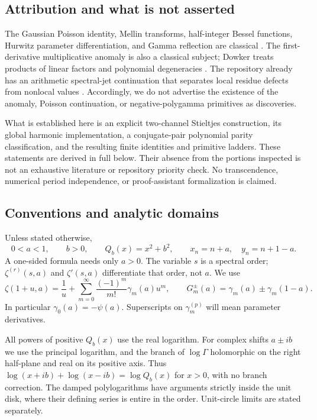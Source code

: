\documentclass[11pt,letterpaper]{article}
\numberwithin{equation}{section}
\theoremstyle{definition}
\begin{document}
\subsection{Attribution and what is not asserted}
The Gaussian Poisson identity, Mellin transforms, half-integer Bessel
functions, Hurwitz parameter differentiation, and Gamma reflection are
classical \cite{theta,bessel,halfK,hurwitz,gamma}. The first-derivative
multiplicative anomaly is also a classical subject; Dowker treats products
of linear factors and polynomial degeneracies \cite{dowker}. The repository
already has an arithmetic spectral-jet continuation that separates local
residue defects from nonlocal values \cite{arithmetic}. Accordingly, we do
not advertise the existence of the anomaly, Poisson continuation, or
negative-polygamma primitives as discoveries.

What is established here is an explicit two-channel Stieltjes construction,
its global harmonic implementation, a conjugate-pair polynomial parity
classification, and the resulting finite identities and primitive ladders.
These statements are derived in full below. Their absence from the portions
inspected is not an exhaustive literature or repository priority check.
No transcendence, numerical period independence, or proof-assistant
formalization is claimed.

\subsection{Conventions and analytic domains}\label{qspec:sec:conventions}
Unless stated otherwise,
\begin{equation}\label{qspec:eq:domain}
0<a<1,\qquad b>0,\qquad Q_b(x)=x^2+b^2,
\qquad x_n=n+a,\quad y_n=n+1-a.
\end{equation}
A one-sided formula needs only $a>0$. The variable $s$ is a spectral order;
$\zeta^{(r)}(s,a)$ and $\zeta'(s,a)$ differentiate that order, not $a$.
We use
\begin{equation}\label{qspec:eq:stieltjes-convention}
\zeta(1+u,a)=\frac1u+
\sum_{m=0}^{\infty}\frac{(-1)^m}{m!}\gamma_m(a)u^m,
\qquad G_m^\pm(a)=\gamma_m(a)\pm\gamma_m(1-a).
\end{equation}
In particular $\gamma_0(a)=-\psi(a)$. Superscripts on $\gamma_m^{(p)}$
will mean parameter derivatives.

All powers of positive $Q_b(x)$ use the real logarithm. For complex shifts
$a\pm ib$ we use the principal logarithm, and the branch of $\log\Gamma$
holomorphic on the right half-plane and real on its positive axis. Thus
$\log(x+ib)+\log(x-ib)=\log Q_b(x)$ for $x>0$, with no branch correction.
The damped polylogarithms have arguments strictly inside the unit disk,
where their defining series is entire in the order. Unit-circle limits
are stated separately.
\end{document}
